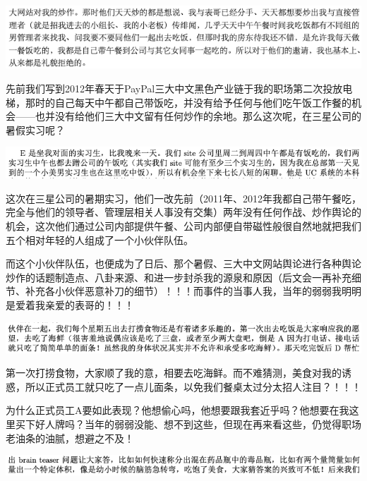 \documentclass[9pt, b5paper]{article}
\begin{document}
\begin{center}
\includegraphics[width=.9\linewidth]{./pic/backups_plans_20210507_211302.png}
\end{center}

先前我们写到2012年春天于PayPal三大中文黑色产业链于我的职场第二次投放电梯，那时的自己每天中午都自己带饭吃，并没有给予任何与他们吃午饭工作餐的机会——也并没有给他们三大中文留有任何炒作的余地。那么这次呢，在三星公司的暑假实习呢？ 

\begin{center}
\includegraphics[width=.9\linewidth]{./pic/backups_plans_20210508_170745.png}
\end{center}

这次在三星公司的暑期实习，他们一改先前（2011年、2012年我都自己带午餐吃，完全与他们的领导者、管理层相关人事没有交集）两年没有任何作战、炒作舆论的机会，这次他们通过公司内部提供午餐、公司内部便自带磁性般很自然地就把我们五个相对年轻的人组成了一个小伙伴队伍。

而这个小伙伴队伍，也便成为了日后、那个暑假、三大中文网站舆论进行各种舆论炒作的话题制造点、八卦来源、和进一步封杀我的源泉和原因（后文会一再补充细节、补充各小伙伴恶意补刀的细节）！！！而事件的当事人我，当年的弱弱我明明是爱着我亲爱的表哥的！！！

\begin{center}
\includegraphics[width=.9\linewidth]{./pic/backups_plans_20210508_090412.png}
\end{center}

第一次打捞食物，大家顺了我的意，相要去吃海鲜。而不难猜测，美食对我的诱惑，所以正式员工就只吃了一点儿面条，以免我们餐桌太过分太招人注目？！！！

为什么正式员工A要如此表现？他想偷心吗，他想要跟我套近乎吗？他想要在我这里买下好人牌吗？当年的弱弱没能、想不到这些，但现在再来看这些，仍觉得职场老油条的油腻，想避之不及！

\begin{center}
\includegraphics[width=.9\linewidth]{./pic/backups_plans_20210508_090810.png}
\end{center}
\end{document}
